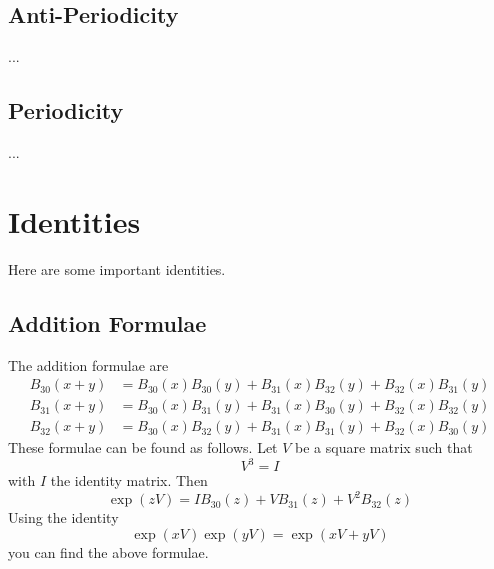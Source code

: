 \subsection{Anti-Periodicity}
...
\subsection{Periodicity}
...
\section{Identities}
Here are some important identities.
\subsection{Addition Formulae}
The addition formulae are
\begin{align}
    B_{30}(x + y) &= B_{30}(x) B_{30}(y) + B_{31}(x) B_{32}(y) + B_{32}(x) B_{31}(y) \\
    B_{31}(x + y) &= B_{30}(x) B_{31}(y) + B_{31}(x) B_{30}(y) + B_{32}(x) B_{32}(y) \\
    B_{32}(x + y) &= B_{30}(x) B_{32}(y) + B_{31}(x) B_{31}(y) + B_{32}(x) B_{30}(y)
\end{align}
These formulae can be found as follows. Let $V$ be a square matrix such that
\begin{equation}
    V^{3} = I
\end{equation}
with $I$ the identity matrix. Then
\begin{equation}
    \exp\left( z V \right) = I B_{30}(z) + V B_{31}(z) + V^{2} B_{32}(z)
\end{equation}
Using the identity
\begin{equation}
    \exp\left( x V \right) \exp\left( y V \right) = \exp\left( xV + yV \right)
\end{equation}
you can find the above formulae.

